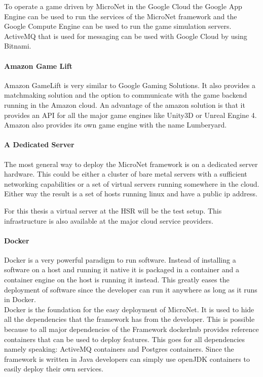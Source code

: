 To operate a game driven by MicroNet in the Google Cloud the Google App Engine
can be used to run the services of the MicroNet framework and the Google Compute
Engine can be used to run the game simulation servers. ActiveMQ that is used for
messaging can be used with Google Cloud by using Bitnami.

\paragraph{Amazon Game Lift}

Amazon GameLift is very similar to Google Gaming Solutions. It also provides a
matchmaking solution and the option to communicate with the game backend running
in the Amazon cloud. An advantage of the amazon solution is that it provides an
API for all the major game engines like Unity3D or Unreal Engine 4. Amazon also
provides its own game engine with the name Lumberyard.

\paragraph{A Dedicated Server}

The most general way to deploy the MicroNet framework is on a dedicated server
hardware. This could be either a cluster of bare metal servers with a sufficient
networking capabilities or a set of virtual servers running somewhere in the
cloud. Either way the result is a set of hosts running linux and have a public
ip address.

For this thesis a virtual server at the HSR will be the test setup. This
infrastructure is also available at the major cloud service providers.

\paragraph{Docker}

Docker is a very powerful paradigm to run software. Instead of installing a
software on a host and running it native it is packaged in a container and a
container engine on the host is running it instead. This greatly eases the
deployment of software since the developer can run it anywhere as long as it
runs in Docker.\\

Docker is the foundation for the easy deployment of MicroNet. It is used to hide
all the dependencies that the framework has from the developer. This is possible
because to all major dependencies of the Framework dockerhub provides reference
containers that can be used to deploy features. This goes for all dependencies
namely speaking: ActiveMQ containers and Postgres containers. Since the
framework is written in Java developers can simply use openJDK containers to
easily deploy their own services.\\

